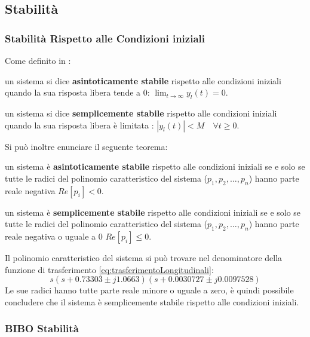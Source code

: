 \subsection{Stabilità}

\subsubsection{Stabilità Rispetto alle Condizioni iniziali}

Come definito in \cite{zampieri_dispensa_controlli}:
\begin{sitemize}
    \item un sistema si dice \textbf{asintoticamente stabile} rispetto alle condizioni iniziali quando la sua risposta libera tende a 0: $\lim_{t\to\infty} y_l(t) = 0$.
    \item un sistema si dice \textbf{semplicemente stabile} rispetto alle condizioni iniziali quando la sua risposta libera è limitata : $\left|y_l(t)\right| < M \quad \forall t \geq 0$.
\end{sitemize}

Si può inoltre enunciare il seguente teorema:
\begin{sitemize}
    \item un sistema è \textbf{asintoticamente stabile} rispetto alle condizioni iniziali se e solo se tutte le radici del polinomio caratteristico del sistema ($p_1, p_2, \dots, p_n$) hanno parte reale negativa $Re[p_i] < 0$.
    \item un sistema è \textbf{semplicemente stabile} rispetto alle condizioni iniziali se e solo se tutte le radici del polinomio caratteristico del sistema ($p_1, p_2, \dots, p_n$) hanno parte reale negativa o uguale a $0$ $Re[p_i] \leq 0$.
\end{sitemize}

Il polinomio caratteristico del sistema si può trovare nel denominatore della funzione di trasferimento \eqref{eq:trasferimentoLongitudinali}:
\begin{equation*}
    s(s + 0.73303 \pm j1.0663)(s + 0.0030727 \pm j0.0097528)
\end{equation*}
Le sue radici hanno tutte parte reale minore o uguale a zero, è quindi possibile concludere che il sistema è semplicemente stabile rispetto alle condizioni iniziali.

\subsubsection{BIBO Stabilità}\label{subsubsec:bibo-instabile}

